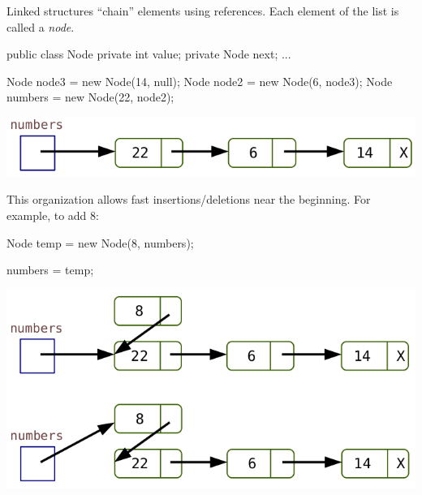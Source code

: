 
Linked structures ``chain'' elements using references.
Each element of the list is called a \textit{node}.

\vspace{1ex}
\begin{minipage}{0.40\linewidth}
\begin{javalst}
    public class Node
    {
        private int value;
        private Node next;
        ...
    }
\end{javalst}
\end{minipage}
\hfill
\begin{minipage}{0.58\linewidth}
\begin{javalst}
    Node node3 = new Node(14, null);
    Node node2 = new Node(6, node3);
    Node numbers = new Node(22, node2);
\end{javalst}
\includegraphics[scale=0.35]{figs/list1.png}
\end{minipage}
\vspace{1em}

This organization allows fast insertions/deletions near the beginning. For example, to add 8:

\vspace{1ex}
\begin{minipage}{0.48\linewidth}
\begin{javalst}
    Node temp = new Node(8, numbers);



    numbers = temp;
\end{javalst}
\end{minipage}
\hfill
\begin{minipage}{0.50\linewidth}
\includegraphics[scale=0.35]{figs/list2.png}
\end{minipage}
\vspace{1em}

